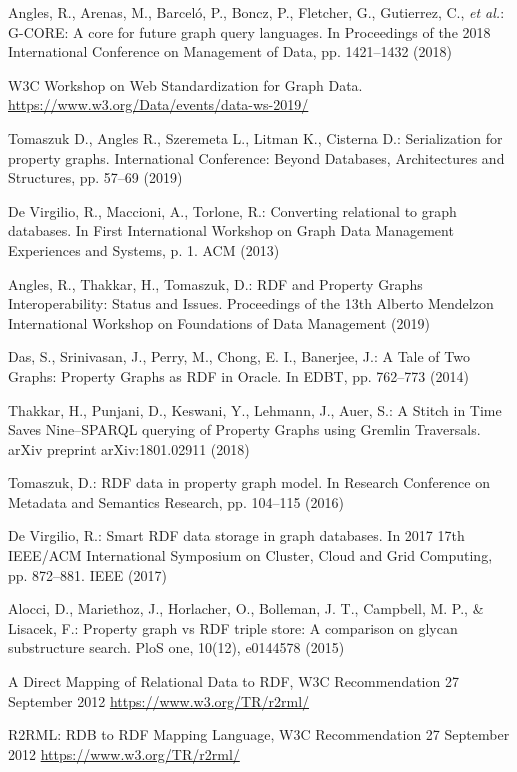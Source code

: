 \documentclass[runningheads]{llncs}
\begin{document}
\begin{thebibliography}{8}
Angles, R., Arenas, M., Barceló, P., Boncz, P., Fletcher, G., Gutierrez, C., {\itshape et al.}: G-CORE: A core for future graph query languages. In Proceedings of the 2018 International Conference on Management of Data, pp. 1421--1432 (2018)

W3C Workshop on Web Standardization for Graph Data. \url{https://www.w3.org/Data/events/data-ws-2019/}

Tomaszuk D., Angles R., Szeremeta L., Litman K., Cisterna D.:
Serialization for property graphs. International Conference: Beyond Databases, Architectures and Structures, pp. 57--69 (2019)

De Virgilio, R., Maccioni, A., Torlone, R.: Converting relational to graph databases. In First International Workshop on Graph Data Management Experiences and Systems, p. 1. ACM (2013)

Angles, R., Thakkar, H., Tomaszuk, D.: RDF and Property Graphs Interoperability: Status and Issues. Proceedings of the 13th Alberto Mendelzon International Workshop on Foundations of Data Management (2019)

Das, S., Srinivasan, J., Perry, M., Chong, E. I., Banerjee, J.: A Tale of Two Graphs: Property Graphs as RDF in Oracle. In EDBT, pp. 762--773 (2014)

Thakkar, H., Punjani, D., Keswani, Y., Lehmann, J., Auer, S.: A Stitch in Time Saves Nine--SPARQL querying of Property Graphs using Gremlin Traversals. arXiv preprint arXiv:1801.02911 (2018)

Tomaszuk, D.: RDF data in property graph model. In Research Conference on Metadata and Semantics Research, pp. 104--115 (2016)

De Virgilio, R.: Smart RDF data storage in graph databases. In 2017 17th IEEE/ACM International Symposium on Cluster, Cloud and Grid Computing, pp. 872--881. IEEE (2017)

Alocci, D., Mariethoz, J., Horlacher, O., Bolleman, J. T., Campbell, M. P., & Lisacek, F.: Property graph vs RDF triple store: A comparison on glycan substructure search. PloS one, 10(12), e0144578 (2015)

A Direct Mapping of Relational Data to RDF, W3C Recommendation 27 September 2012 \url{https://www.w3.org/TR/r2rml/}

R2RML: RDB to RDF Mapping Language, W3C Recommendation 27 September 2012 \url{https://www.w3.org/TR/r2rml/}



\end{thebibliography}
\end{document}
